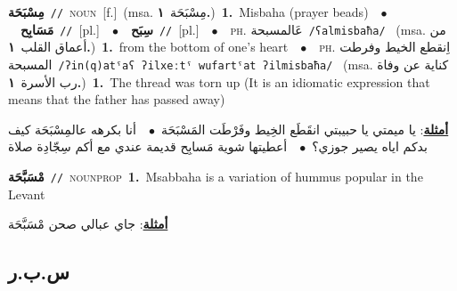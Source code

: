 \documentclass[10pt,a4paper,twoside]{article} %
\begin{document}
\begin{multicols}{2}
{{{{{\setlength\topsep{0pt}\textbf{\foreignlanguage{arabic}{مِسْبَحَة}}\ {\color{gray}\texttt{//}\color{black}}\ \textsc{noun}\ [f.]\ \color{gray}(msa. \foreignlanguage{arabic}{مِسْبَحَة}~\foreignlanguage{arabic}{\textbf{١.}})\color{black}\ \textbf{1.}~Misbaha (prayer beads)\ \ $\bullet$\ \ \setlength\topsep{0pt}\textbf{\foreignlanguage{arabic}{مَسَابِح}}\ {\color{gray}\texttt{//}\color{black}}\ [pl.]\ \ $\bullet$\ \ \setlength\topsep{0pt}\textbf{\foreignlanguage{arabic}{سِبَح}}\ {\color{gray}\texttt{//}\color{black}}\ [pl.]\ \ $\bullet$\ \ \textsc{ph.} \color{gray} \foreignlanguage{arabic}{عَالمسبحة}\color{black}\ {\color{gray}\texttt{/{\sffamily ʕalmisbaħa}/}\color{black}}\ \color{gray} (msa. \foreignlanguage{arabic}{من أعماق القلب}~\foreignlanguage{arabic}{\textbf{١.}})\color{black}\ \textbf{1.}~from the bottom of one's heart\ \ $\bullet$\ \ \textsc{ph.} \color{gray} \foreignlanguage{arabic}{اِنقطع الخيط وفرطت المسبحة}\color{black}\ {\color{gray}\texttt{/{\sffamily ʔin(q)atˤaʕ ʔilxeːtˤ wufartˤat ʔilmisbaħa}/}\color{black}}\ \color{gray} (msa. \foreignlanguage{arabic}{كناية عن وفاة رب الأسرة}~\foreignlanguage{arabic}{\textbf{١.}})\color{black}\ \textbf{1.}~The thread was torn up (It is an idiomatic expression that means that the father has passed away)\  \begin{flushright}\color{gray}\foreignlanguage{arabic}{\textbf{\underline{\foreignlanguage{arabic}{أمثلة}}}: يا ميمتي يا حبيبتي انقَطَع الخِيط وفَرْطَت المَسْبَحَة\ $\bullet$\ \  أنا بكرهه عالمِسْبَحَة كيف بدكم اياه يصير جوزي؟\ $\bullet$\ \  أعطيتها شوية مَسابِح قديمة عندي مع أكم سِجّادِة صلاة}\end{flushright}\color{black}} \vspace{2mm}

{\setlength\topsep{0pt}\textbf{\foreignlanguage{arabic}{مْسَبَّحَة}}\ {\color{gray}\texttt{//}\color{black}}\ \textsc{noun\textunderscore prop}\ \textbf{1.}~Msabbaha is a variation of hummus popular in the Levant\  \begin{flushright}\color{gray}\foreignlanguage{arabic}{\textbf{\underline{\foreignlanguage{arabic}{أمثلة}}}: جاي عبالي صحن مْسَبَّحَة}\end{flushright}\color{black}} \vspace{2mm}

\vspace{-3mm}
\subsection*{\color{blue}\foreignlanguage{arabic}{س.ب.ر}\color{blue}{}} 

}}}}
\end{multicols}
\end{document}

